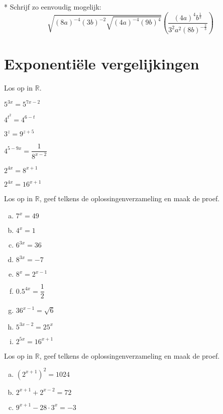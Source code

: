 \documentclass[12pt,twoside]{article}
\begin{document}
\begin{oefening}*
Schrijf zo eenvoudig mogelijk:
$$\sqrt{\left(8a\right)^{-4}\left(3b\right)^{-2}\sqrt{\left(4a\right)^{-4}\left(9b\right)^4}}\left(\dfrac{\left(4a\right)^4b^{\frac{1}{3}}}{3^2a^2\left(8b\right)^{-\frac{2}{3}}}\right)$$
\end{oefening}

\pagebreak
\section{Exponentiële vergelijkingen}

\begin{oefening}
Los op in $\mathbb{R}$.
\begin{exlist}{3}
  \item $5^{3x}=5^{7x-2}$
  \item $4^{t^2}=4^{6-t}$
  \item $3^z=9^{z+5}$
  \item $4^{5-9x}=\dfrac{1}{8^{x-2}}$
  \item $2^{4x}=8^{x+1}$
  \item $2^{4x}=16^{x+1}$
\end{exlist}
\end{oefening}


\begin{oefening}
Los op in $\mathbb{R}$, geef telkens de oplossingenverzameling en maak de proef.
\begin{multicols}{3}
\begin{enumerate}[(a)]
  \itemsep.5em
  \item $7^x=49$
  \item $4^x=1$
  \item $6^{3x}=36$
  \item $8^{3x}=-7$
  \item $8^x=2^{x-1}$
  \item $0.5^{4x}=\dfrac{1}{2}$
  \item $36^{x-1}=\sqrt{6}$
  \item $5^{3x-2}=25^x$
  \item $2^{5x}=16^{x+1}$
\end{enumerate}
\end{multicols}
\end{oefening}

\begin{oefening}
Los op in $\mathbb{R}$, geef telkens de oplossingenverzameling en maak de proef.
\begin{multicols}{3}
\begin{enumerate}[(a)]
  \itemsep.5em
  \item $\left(2^{x+1}\right)^2=1024$
  \item $2^{x+1}+2^{x-2}=72$
  \item $9^{x+1}-28\cdot 3^x=-3$
\end{enumerate}
\end{multicols}
\end{oefening}
\end{document}
